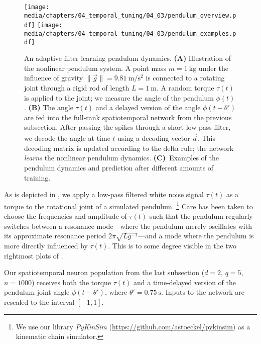 \begin{figure}
	\centering
	\texttt{[image: media/chapters/04\_temporal\_tuning/04\_03/pendulum\_overview.pdf]}
	\texttt{[image: media/chapters/04\_temporal\_tuning/04\_03/pendulum\_examples.pdf]}%
	{\label{fig:pendulum_overview_a}}%
	{\label{fig:pendulum_overview_b}}%
	{\label{fig:pendulum_overview_c}}%
	\caption[An adaptive filter learning pendulum dynamics]{
		An adaptive filter learning pendulum dynamics.
		\textbf{(A)} Illustration of the nonlinear pendulum system.
		A point mass $m = \SI{1}{\kilogram}$ under the influence of gravity $\| \vec g \| = \SI{9.81}{\metre\per\square\second}$ is connected to a rotating joint through a rigid rod of length $L = \SI{1}{\metre}$.
		A random torque $\tau(t)$ is applied to the joint; we measure the angle of the pendulum $\phi(t)$.
		\textbf{(B)} The angle $\tau(t)$ and a delayed version of the angle $\phi(t - \theta')$ are fed into the full-rank spatiotemporal \NEF network from the previous subsection.
		After passing the spikes through a short low-pass filter, we decode the angle at time $t$ using a decoding vector $\vec d$.
		This decoding matrix is updated according to the delta rule; the network \emph{learns} the nonlinear pendulum dynamics.
		\textbf{(C)}~Examples of the pendulum dynamics and prediction after different amounts of training.
	}
	\label{fig:pendulum_overview}
\end{figure}
As is depicted in , we apply a low-pass filtered white noise signal $\tau(t)$ as a torque to the rotational joint of a simulated pendulum.%
\footnote{We use our library \emph{PyKinSim} (\url{https://github.com/astoeckel/pykinsim}) as a kinematic chain simulator.}
Care has been taken to choose the frequencies and amplitude of $\tau(t)$ such that the pendulum regularly switches between a resonance mode---where the pendulum merely oscillates with its approximate resonance period $2 \pi \sqrt{L g^{-1}}$---and a mode where the pendulum is more directly influenced by $\tau(t)$.
This is to some degree visible in the two rightmost plots of .

Our spatiotemporal neuron population from the last subsection ($d = 2$, $q = 5$, $n = 1000$) receives both the torque $\tau(t)$ and a time-delayed version of the pendulum joint angle $\phi(t - \theta')$, where $\theta' = \SI{0.75}{\second}$.
Inputs to the network are rescaled to the interval $[-1, 1]$.

\pagebreak

